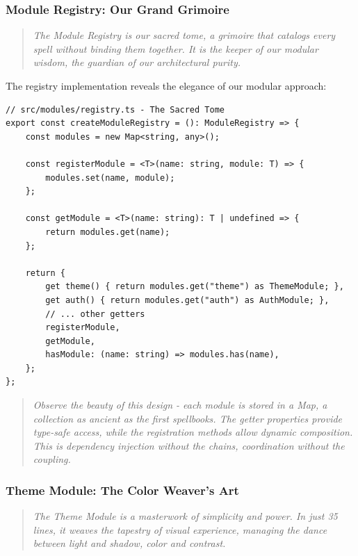 \documentclass[11pt]{article}
\begin{document}
\subsubsection{Module Registry: Our Grand Grimoire}

\begin{quote}
\emph{The Module Registry is our sacred tome, a grimoire that catalogs every spell without binding them together. It is the keeper of our modular wisdom, the guardian of our architectural purity.}
\end{quote}

The registry implementation reveals the elegance of our modular approach:

\begin{lstlisting}[style=typescript]
// src/modules/registry.ts - The Sacred Tome
export const createModuleRegistry = (): ModuleRegistry => {
    const modules = new Map<string, any>();
    
    const registerModule = <T>(name: string, module: T) => {
        modules.set(name, module);
    };
    
    const getModule = <T>(name: string): T | undefined => {
        return modules.get(name);
    };
    
    return {
        get theme() { return modules.get("theme") as ThemeModule; },
        get auth() { return modules.get("auth") as AuthModule; },
        // ... other getters
        registerModule,
        getModule,
        hasModule: (name: string) => modules.has(name),
    };
};
\end{lstlisting}

\begin{quote}
\emph{Observe the beauty of this design - each module is stored in a Map, a collection as ancient as the first spellbooks. The getter properties provide type-safe access, while the registration methods allow dynamic composition. This is dependency injection without the chains, coordination without the coupling.}
\end{quote}

\subsubsection{Theme Module: The Color Weaver's Art}

\begin{quote}
\emph{The Theme Module is a masterwork of simplicity and power. In just 35 lines, it weaves the tapestry of visual experience, managing the dance between light and shadow, color and contrast.}
\end{quote}
\end{document}
